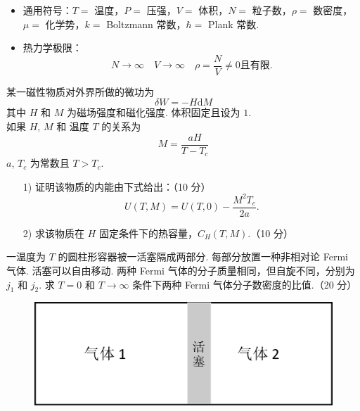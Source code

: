 \documentclass{assignment}
\begin{document}
\begin{itemize}
    \item 通用符号：$T=$ 温度，$P=$ 压强，$V=$ 体积，$N=$ 粒子数，$\rho=$ 数密度，$\mu=$ 化学势，$k=$ Boltzmann 常数，$\hbar=$ Plank 常数.
    \item 热力学极限：
    \[
        N\rightarrow\infty\quad V\rightarrow\infty\quad\rho=\frac{N}{V}\neq 0\text{且有限}.
    \]
\end{itemize}
\begin{prob}
    某一磁性物质对外界所做的微功为
    \[
        \delta W=-H\mathrm{d}M
    \]
    其中 $H$ 和 $M$ 为磁场强度和磁化强度. 体积固定且设为 $1$.\\
    如果 $H$, $M$ 和 温度 $T$ 的关系为
    \[
        M=\frac{aH}{T-T_c}
    \]
    $a$, $T_c$ 为常数且 $T>T_c$.
    \begin{itemize}
        \item[1)] 证明该物质的内能由下式给出：（10 分）
        \[
            U(T,M)=U(T,0)-\frac{M^2T_c}{2a}.
        \]
        \item[2)] 求该物质在 $H$ 固定条件下的热容量，$C_H(T,M)$.（10 分）
    \end{itemize}
\end{prob}
\begin{sol}
    
\end{sol}
\clearpage

\begin{prob}
    一温度为 $T$ 的圆柱形容器被一活塞隔成两部分. 每部分放置一种非相对论 Fermi 气体. 活塞可以自由移动. 两种 Fermi 气体的分子质量相同，但自旋不同，分别为 $j_1$ 和 $j_2$. 求 $T=0$ 和 $T\rightarrow\infty$ 条件下两种 Fermi 气体分子数密度的比值.（20 分）
    \begin{figure}[h]
        \centering
        \includegraphics[width=.5\columnwidth]{P2.png}
    \end{figure}
\end{prob}
\begin{sol}
    
\end{sol}
\clearpage
\end{document}
